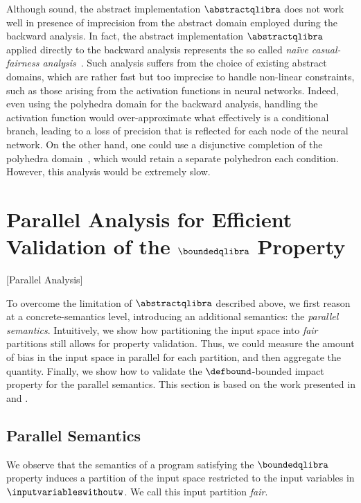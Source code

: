 Although sound, the abstract implementation $\abstractqlibra$ does not work well in presence of imprecision from the abstract domain employed during the backward analysis.
In fact, the abstract implementation $\abstractqlibra$ applied directly to the backward analysis represents the so called \emph{na\"ive casual-fairness analysis}~.
Such analysis suffers from the choice of existing abstract domains, which are rather fast but too imprecise to handle non-linear constraints, such as those arising from the activation functions in neural networks.
Indeed, even using the polyhedra domain for the backward analysis, handling the \relu{} activation function would over-approximate what effectively is a conditional branch, leading to a loss of precision that is reflected for each node of the neural network.
On the other hand, one could use a disjunctive completion of the polyhedra domain~, which would retain a separate polyhedron each condition.
However, this analysis would be extremely slow.

\section{Parallel Analysis for Efficient Validation of the \texorpdfstring{$\boundedqlibra$ Property}{k-Bounded Impact Property applied to qlibra}}[Parallel Analysis]

To overcome the limitation of $\abstractqlibra$ described above, we first reason at a concrete-semantics level, introducing an additional semantics: the \emph{parallel semantics}.
Intuitively, we show how partitioning the input space into \emph{fair} partitions still allows for property validation.
Thus, we could measure the amount of bias in the input space in parallel for each partition, and then aggregate the quantity.
Finally, we show how to validate the $\defbound$-bounded impact property for the parallel semantics.
This section is based on the work presented in  and .


\subsection{Parallel Semantics}

We observe that the semantics of a program satisfying the $\boundedqlibra$ property induces a partition of the input space restricted to the input variables in $\inputvariableswithoutw$.
We call this input partition \emph{fair}.

